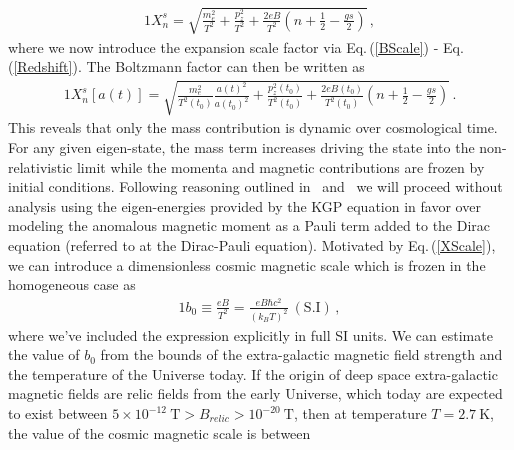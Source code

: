 \documentclass[universe,article,submit,moreauthors,pdftex,a4paper]{Definitions/mdpi}
\newcommand{\req}[1]{Eq.\,(\ref{#1})}
\begin{document}
\begin{alignat}{1}
 \label{XExplicit} X_{n}^{s} = \sqrt{\frac{m_{e}^{2}}{T^{2}}+\frac{p_{z}^{2}}{T^{2}}+\frac{2eB}{T^{2}}\left(n+\frac{1}{2}-\frac{gs}{2}\right)}\,,
\end{alignat}
where we now introduce the expansion scale factor via \req{BScale} - \req{Redshift}. The Boltzmann factor can then be written as
\begin{alignat}{1}
 \label{XScale} X_{n}^{s}[a(t)] = \sqrt{\frac{m_{e}^{2}}{T^{2}(t_{0})}\frac{a(t)^{2}}{a(t_{0})^{2}}+\frac{p_{z}^{2}(t_{0})}{T^{2}(t_{0})}+\frac{2eB(t_{0})}{T^{2}(t_{0})}\left(n+\frac{1}{2}-\frac{gs}{2}\right)}\,.
\end{alignat}
This reveals that only the mass contribution is dynamic over cosmological time. For any given eigen-state, the mass term increases driving the state into the non-relativistic limit while the momenta and magnetic contributions are frozen by initial conditions.
Following reasoning outlined in~\cite{rafelski2023study} and~\cite{Steinmetz:2018ryf} we will proceed without analysis using the eigen-energies provided by the KGP equation in favor over modeling the anomalous magnetic moment as a Pauli term added to the Dirac equation (referred to at the Dirac-Pauli equation). Motivated by \req{XScale}, we can introduce a dimensionless cosmic magnetic scale which is frozen in the homogeneous case as
\begin{alignat}{1}
 \label{Bo} b_{0}\equiv\frac{eB}{T^{2}}=\frac{eB\hbar c^{2}}{(k_{B}T)^{2}}\ \mathrm{(S.I)}\,,
\end{alignat}
where we've included the expression explicitly in full SI units. We can estimate the value of $b_{0}$ from the bounds of the extra-galactic magnetic field strength and the temperature of the Universe today. If the origin of deep space extra-galactic magnetic fields are relic fields from the early Universe, which today are expected to exist between $5\times10^{-12}\ \mathrm{T}>B_{relic}>10^{-20}\ \mathrm{T}$, then at temperature $T=2.7\ \mathrm{K}$, the value of the cosmic magnetic scale is between
\end{document}
